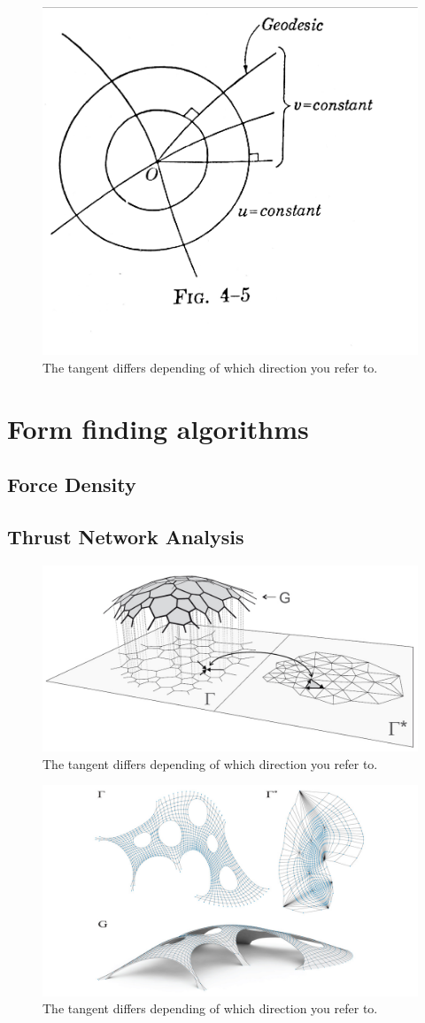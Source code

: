 \begin{figure}[H]
\centering
\includegraphics[height=0.5\linewidth ]{figure/Theory/polarGeodesicCoordMod.pdf}
\caption{The tangent differs depending of which direction you refer to. }
\end{figure}

\section{Form finding algorithms}

\subsection{Force Density}

\subsection{Thrust Network Analysis}

\begin{figure}[H]
\centering
\includegraphics[width=0.6\linewidth ]{figure/Theory/TNA.jpg}
\caption{The tangent differs depending of which direction you refer to. }
\end{figure}

\begin{figure}[H]
\centering
\includegraphics[width=0.6\linewidth ]{figure/Theory/RhinoVault.jpg}
\caption{The tangent differs depending of which direction you refer to. }
\end{figure}

